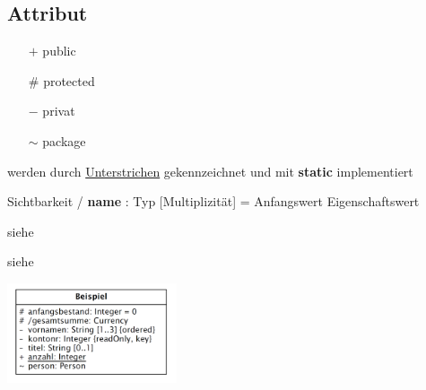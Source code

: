 \subsection{Attribut }
  \begin{description}
    \item[Sichtbarkeit]
      \begin{itemize}[leftmargin=0.5cm]
        \item[$+$] public
        \item[$\#$] protected
        \item[$-$] privat
        \item[$\sim$] package
      \end{itemize}
    \item[Klassenattribute]
      werden durch \underline{Unterstrichen} gekennzeichnet und mit \textbf{static} implementiert
    \item[Notation]
      Sichtbarkeit / \textbf{name} : Typ [Multiplizität] = Anfangswert {Eigenschaftswert} \\
    \parbox{6cm}{
      \item[Eigenschaftswerte]
        siehe 
      \item[Implementation]
        siehe  }
    \parbox{6cm}{\includegraphics[width=5cm]{./bilder/Notation_Attribute.png}}
  \end{description}
  
  